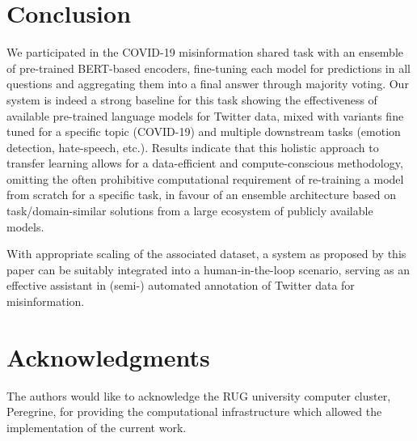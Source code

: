 \documentclass[11pt,a4paper]{article}
\begin{document}
\section{Conclusion}
We participated in the COVID-19 misinformation shared task with an ensemble of pre-trained BERT-based encoders, fine-tuning each model for predictions in all questions and aggregating them into a final answer through majority voting. 
Our system is indeed a strong baseline for this task showing the effectiveness of available pre-trained language models for Twitter data, mixed with variants fine tuned for a specific topic (COVID-19) and multiple downstream tasks (emotion detection, hate-speech, etc.).  
Results indicate that this holistic approach to transfer learning allows for a data-efficient and compute-conscious methodology, omitting the often prohibitive computational requirement of re-training a model from scratch for a specific task, in favour of an ensemble architecture based on task/domain-similar solutions from a large ecosystem of publicly available models.

With appropriate scaling of the associated dataset, a system as proposed by this paper can be suitably integrated into a human-in-the-loop scenario, serving as an effective assistant in (semi-) automated annotation of Twitter data for misinformation.

\newpage
\section*{Acknowledgments}

The authors would like to acknowledge the RUG university computer cluster, Peregrine, for providing the computational infrastructure which allowed the implementation of the current work.



\end{document}
